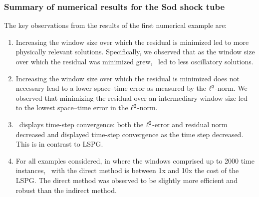 

\subsubsection{Summary of numerical results for the Sod shock tube}
The key observations from the results of the first numerical example are: 
\begin{enumerate}
\item Increasing the window size over which the residual is minimized led to more physically relevant solutions. Specifically, we observed that as the window size over which the residual was minimized grew, \methodAcronym\ led to less oscillatory solutions.
\item Increasing the window size over which the residual is minimized does not necessary lead to a lower space--time error as measured by the $\ell^2$-norm. We observed that minimizing the residual over an intermediary window size led to the lowest space--time error in the $\ell^2$-norm. 
\item \methodAcronym\ displays time-step convergence: both the $\ell^2$-error and residual norm decreased and displayed time-step convergence as the time step decreased. This is in contrast to LSPG.
\item For all examples considered, in where the windows comprised up to 2000 time instances, \methodAcronym\ with the direct method is between 1x and 10x the cost of the LSPG. The 
direct method was observed to be slightly more efficient and robust than the indirect method.
\end{enumerate} 



